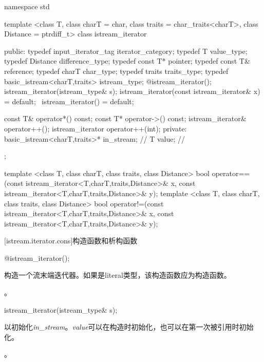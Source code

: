 \begin{codeblock}
namespace std {
  template <class T, class charT = char, class traits = char_traits<charT>,
      class Distance = ptrdiff_t>
  class istream_iterator {
  public:
    typedef input_iterator_tag iterator_category;
    typedef T value_type;
    typedef Distance difference_type;
    typedef const T* pointer;
    typedef const T& reference;
    typedef charT char_type;
    typedef traits traits_type;
    typedef basic_istream<charT,traits> istream_type;
    @\seebelow@ istream_iterator();
    istream_iterator(istream_type& s);
    istream_iterator(const istream_iterator& x) = default;
   ~istream_iterator() = default;

    const T& operator*() const;
    const T* operator->() const;
    istream_iterator& operator++();
    istream_iterator  operator++(int);
  private:
    basic_istream<charT,traits>* in_stream; // \expos
    T value;                                // \expos
  };

  template <class T, class charT, class traits, class Distance>
    bool operator==(const istream_iterator<T,charT,traits,Distance>& x,
            const istream_iterator<T,charT,traits,Distance>& y);
  template <class T, class charT, class traits, class Distance>
    bool operator!=(const istream_iterator<T,charT,traits,Distance>& x,
            const istream_iterator<T,charT,traits,Distance>& y);
}
\end{codeblock}

[istream.iterator.cons]{构造函数和析构函数}


%
\begin{itemdecl}
@\seebelow@ istream_iterator();
\end{itemdecl}

\begin{itemdescr}
\pnum
\effects
构造一个流末端迭代器。如果是literal类型，该构造函数应为构造函数。

\pnum
\postcondition {}。
\end{itemdescr}


%
\begin{itemdecl}
istream_iterator(istream_type& s);
\end{itemdecl}

\begin{itemdescr}
\pnum
\effects
以初始化\textit{in_stream}。\textit{value}可以在构造时初始化，也可以在第一次被引用时初始化。

\pnum
\postcondition {}。
\end{itemdescr}


